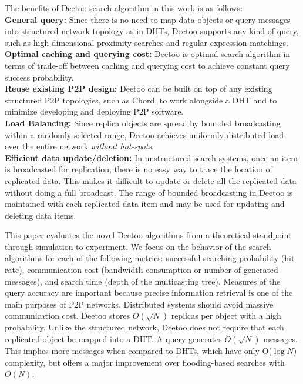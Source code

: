 \documentclass[9.5pt,journal,final,finalsubmission,twocolumn]{IEEEtran}
\begin{document}
The benefits of Deetoo search algorithm in this work is as follows:\\ 
{\bf General query:} Since there is no need to map data objects or query 
messages into structured network topology as in DHTs, Deetoo supports
any kind of query, such as high-dimensional proximity searches and regular 
expression matchings.\\
{\bf Optimal caching and querying cost:} Deetoo is optimal search algorithm
in terms of trade-off between caching and querying cost to achieve 
constant query success probability.\\
{\bf Reuse existing P2P design:}
Deetoo can be built on top of any existing structured P2P topologies, such as
Chord, to work alongside a DHT and to minimize developing and deploying P2P 
software.\\
{\bf Load Balancing:} 
Since replica objects are spread by bounded broadcasting within 
a randomly selected range, Deetoo achieves uniformly distributed 
load over the entire network \emph{without hot-spots}.\\
{\bf Efficient data update/deletion:} In unstructured search systems, 
once an item is broadcasted for replication, 
there is no easy way to trace the location of replicated data. 
This makes it difficult to update or delete all the replicated data without
doing a full broadcast.
The range of bounded broadcasting in Deetoo is maintained with 
each replicated data item and may be used for updating
and deleting data items.

This paper evaluates the novel Deetoo algorithms from a theoretical 
standpoint through simulation to experiment. 
We focus on the behavior of the search algorithms for each of the
following metrics: successful searching probability (hit rate),
communication cost (bandwidth consumption or number of
generated messages), and search time (depth of the multicasting tree). 
Measures of the query accuracy are important because precise information 
retrieval is one of the main purposes of P2P networks. 
Distributed systems should avoid massive communication cost. Deetoo stores 
$O(\sqrt{N})$ replicas per object with a high probability. 
Unlike the structured network, Deetoo does not require that each replicated object 
be mapped into a DHT.
A query generates $O(\sqrt{N})$ messages.
This implies more messages when compared to DHTs, which have only O($\log N$) complexity,
but offers a major improvement over flooding-based searches with
$O(N)$.
\end{document}
